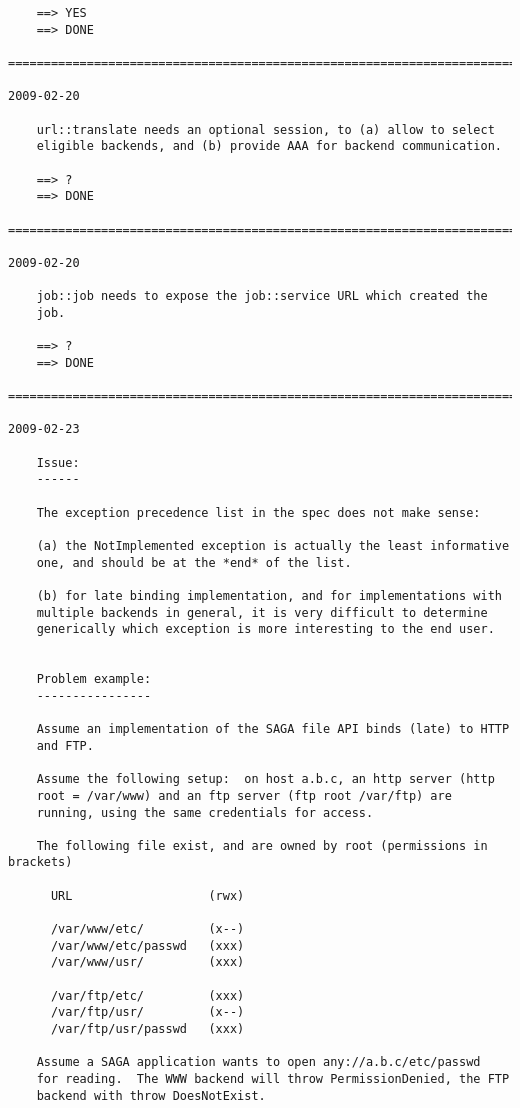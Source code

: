 \documentclass{article}
\begin{document}
\begin{verbatim}
    ==> YES
    ==> DONE
    
=========================================================================

2009-02-20

    url::translate needs an optional session, to (a) allow to select
    eligible backends, and (b) provide AAA for backend communication.

    ==> ?
    ==> DONE
    
=========================================================================

2009-02-20

    job::job needs to expose the job::service URL which created the
    job.

    ==> ?
    ==> DONE
    
=========================================================================

2009-02-23

    Issue: 
    ------

    The exception precedence list in the spec does not make sense:
    
    (a) the NotImplemented exception is actually the least informative
    one, and should be at the *end* of the list.

    (b) for late binding implementation, and for implementations with
    multiple backends in general, it is very difficult to determine
    generically which exception is more interesting to the end user.


    Problem example:
    ----------------

    Assume an implementation of the SAGA file API binds (late) to HTTP
    and FTP.

    Assume the following setup:  on host a.b.c, an http server (http
    root = /var/www) and an ftp server (ftp root /var/ftp) are
    running, using the same credentials for access.

    The following file exist, and are owned by root (permissions in brackets)

      URL                   (rwx)

      /var/www/etc/         (x--)
      /var/www/etc/passwd   (xxx)
      /var/www/usr/         (xxx)

      /var/ftp/etc/         (xxx)
      /var/ftp/usr/         (x--)
      /var/ftp/usr/passwd   (xxx)

    Assume a SAGA application wants to open any://a.b.c/etc/passwd
    for reading.  The WWW backend will throw PermissionDenied, the FTP
    backend with throw DoesNotExist.


\end{verbatim}
\end{document}
